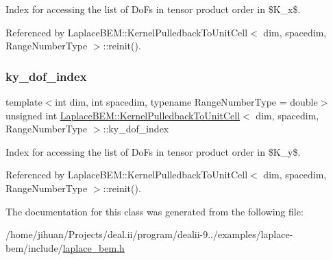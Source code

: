 Index for accessing the list of Do\+Fs in tensor product order in \$\+K\+\_\+x\$. 

Referenced by Laplace\+B\+E\+M\+::\+Kernel\+Pulledback\+To\+Unit\+Cell$<$ dim, spacedim, Range\+Number\+Type $>$\+::reinit().

\mbox{\label{classLaplaceBEM_1_1KernelPulledbackToUnitCell_ae6f3e4bc6cf09546bf11d01812f9b692}} 
\subsubsection{\texorpdfstring{ky\+\_\+dof\+\_\+index}{ky\_dof\_index}}
{\footnotesize\ttfamily template$<$int dim, int spacedim, typename Range\+Number\+Type = double$>$ \\
unsigned int \hyperlink{classLaplaceBEM_1_1KernelPulledbackToUnitCell}{Laplace\+B\+E\+M\+::\+Kernel\+Pulledback\+To\+Unit\+Cell}$<$ dim, spacedim, Range\+Number\+Type $>$\+::ky\+\_\+dof\+\_\+index\hspace{0.3cm}{\ttfamily [private]}}

Index for accessing the list of Do\+Fs in tensor product order in \$\+K\+\_\+y\$. 

Referenced by Laplace\+B\+E\+M\+::\+Kernel\+Pulledback\+To\+Unit\+Cell$<$ dim, spacedim, Range\+Number\+Type $>$\+::reinit().



The documentation for this class was generated from the following file\+:\begin{DoxyCompactItemize}
\item 
/home/jihuan/\+Projects/deal.\+ii/program/dealii-\/9../examples/laplace-\/bem/include/\hyperlink{laplace__bem_8h}{laplace\+\_\+bem.\+h}\end{DoxyCompactItemize}
